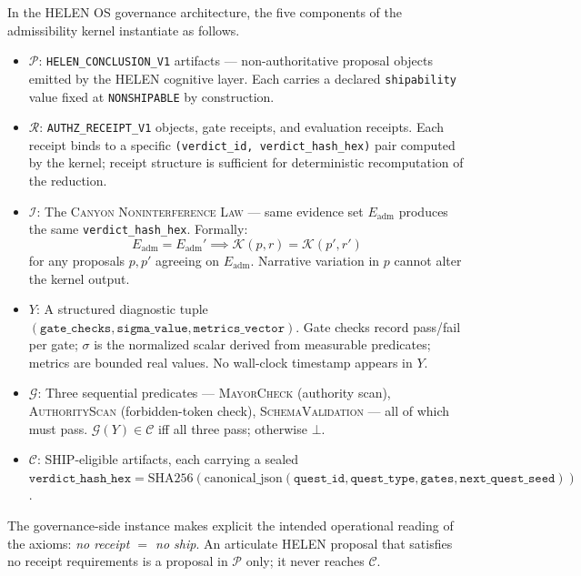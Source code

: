 \documentclass[12pt]{amsart}
\numberwithin{equation}{section}
\theoremstyle{definition}
\theoremstyle{remark}
\newcommand{\PP}{\mathcal P}
\newcommand{\RRc}{\mathcal R}
\newcommand{\II}{\mathcal I}
\newcommand{\KK}{\mathcal K}
\newcommand{\GG}{\mathcal G}
\newcommand{\CC}{\mathcal C}
\newcommand{\YY}{Y}
\begin{document}
In the HELEN OS governance architecture, the five components of the admissibility kernel
instantiate as follows.

\begin{itemize}[leftmargin=2em]
  \item $\PP$: \texttt{HELEN\_CONCLUSION\_V1} artifacts — non-authoritative proposal objects
    emitted by the HELEN cognitive layer.  Each carries a declared \texttt{shipability} value
    fixed at \texttt{NONSHIPABLE} by construction.

  \item $\RRc$: \texttt{AUTHZ\_RECEIPT\_V1} objects, gate receipts, and evaluation receipts.
    Each receipt binds to a specific \texttt{(verdict\_id, verdict\_hash\_hex)} pair computed
    by the kernel; receipt structure is sufficient for deterministic recomputation of the
    reduction.

  \item $\II$: The \textsc{Canyon Noninterference Law} — same evidence set $E_{\mathrm{adm}}$
    produces the same \texttt{verdict\_hash\_hex}.  Formally:
    \[
      E_{\mathrm{adm}} = E_{\mathrm{adm}}' \implies \KK(p, r) = \KK(p', r')
    \]
    for any proposals $p, p'$ agreeing on $E_{\mathrm{adm}}$.  Narrative variation in
    $p$ cannot alter the kernel output.

  \item $\YY$: A structured diagnostic tuple
    $(\texttt{gate\_checks}, \texttt{sigma\_value}, \texttt{metrics\_vector})$.
    Gate checks record pass/fail per gate; $\sigma$ is the normalized scalar derived from
    measurable predicates; metrics are bounded real values.  No wall-clock timestamp appears
    in $\YY$.

  \item $\GG$: Three sequential predicates — \textsc{MayorCheck} (authority scan),
    \textsc{AuthorityScan} (forbidden-token check), \textsc{SchemaValidation} —
    all of which must pass.  $\GG(\YY) \in \CC$ iff all three pass; otherwise $\bot$.

  \item $\CC$: SHIP-eligible artifacts, each carrying a sealed
    $\texttt{verdict\_hash\_hex} = \mathrm{SHA256}(\mathrm{canonical\_json}(
    \texttt{quest\_id}, \texttt{quest\_type}, \texttt{gates}, \texttt{next\_quest\_seed}))$.
\end{itemize}

The governance-side instance makes explicit the intended operational reading of the axioms:
\emph{no receipt $=$ no ship}.  An articulate HELEN proposal that satisfies no receipt
requirements is a proposal in $\PP$ only; it never reaches $\CC$.
\end{document}
